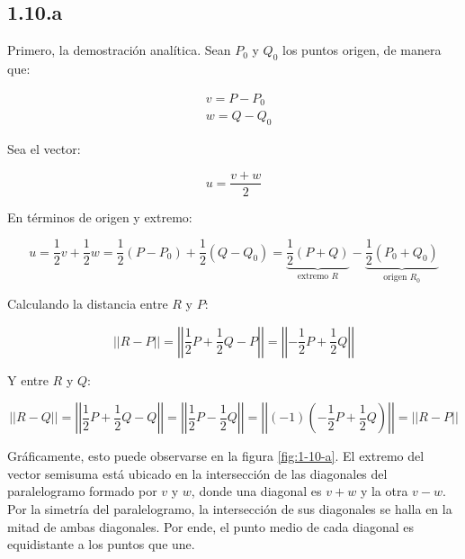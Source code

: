 \documentclass{article}
\begin{document}
\subsection*{1.10.a}
\label{subsec:1.10.a}

Primero, la demostración analítica. Sean $P_0$ y $Q_0$ los puntos origen, de manera que:

\begin{subequations}
\begin{align}
& v = P - P_0 \\
& w = Q - Q_0
\end{align}
\end{subequations}

Sea el vector:

\begin{equation}
u = \frac{v + w}{2}
\end{equation}

En términos de origen y extremo:

\begin{equation}
u = \frac{1}{2} v + \frac{1}{2} w = \frac{1}{2} (P-P_0) + \frac{1}{2} (Q-Q_0) = \underbrace{ \frac{1}{2} (P+Q) }_{\text{extremo } R} - \underbrace{ \frac{1}{2} (P_0+Q_0) }_{\text{origen } R_0}
\end{equation}

Calculando la distancia entre $R$ y $P$:

\begin{equation}
||R-P|| = \left|\left| \frac{1}{2} P + \frac{1}{2} Q - P \right|\right| = \left|\left| -\frac{1}{2} P + \frac{1}{2} Q \right|\right|
\end{equation}

Y entre $R$ y $Q$:

\begin{equation}
||R-Q|| = \left|\left| \frac{1}{2} P + \frac{1}{2} Q - Q \right|\right| = \left|\left| \frac{1}{2} P - \frac{1}{2} Q \right|\right| = \left|\left| (-1) \left(- \frac{1}{2} P + \frac{1}{2} Q \right) \right|\right| = ||R-P||
\end{equation}

Gráficamente, esto puede observarse en la figura \ref{fig:1-10-a}. El extremo del vector semisuma está ubicado en la intersección de las diagonales del paralelogramo formado por $v$ y $w$, donde una diagonal es $v+w$ y la otra $v-w$. Por la simetría del paralelogramo, la intersección de sus diagonales se halla en la mitad de ambas diagonales. Por ende, el punto medio de cada diagonal es equidistante a los puntos que une.
\end{document}
